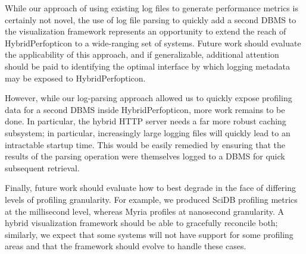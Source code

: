\documentclass{chi2009}
\begin{document}
While our approach of using existing log files to generate performance metrics is certainly not novel, the use of log file parsing to quickly add a second DBMS to the visualization framework represents an opportunity to extend the reach of HybridPerfopticon to a wide-ranging set of systems.  Future work should evaluate the applicability of this approach, and if generalizable, additional attention should be paid to identifying the optimal interface by which logging metadata may be exposed to HybridPerfopticon.

However, while our log-parsing approach allowed us to quickly expose profiling data for a second DBMS inside HybridPerfopticon, more work remains to be done.  In particular, the hybrid HTTP server needs a far more robust caching subsystem; in particular, increasingly large logging files will quickly lead to an intractable startup time.  This would be easily remedied by ensuring that the results of the parsing operation were themselves logged to a DBMS for quick subsequent retrieval.

Finally, future work should evaluate how to best degrade in the face of differing levels of profiling granularity.  For example, we produced SciDB profiling metrics at the millisecond level, whereas Myria profiles at nanosecond granularity.  A hybrid visualization framework should be able to gracefully reconcile both; similarly, we expect that some systems will not have support for some profiling areas and that the framework should evolve to handle these cases.



\end{document}
